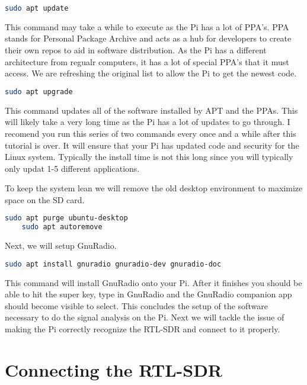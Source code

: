 \documentclass[letterpaper,12pt,notitlepage]{report} %
\begin{document}
\begin{lstlisting}[language=bash]
	sudo apt update
\end{lstlisting}

This command may take a while to execute as the Pi has a lot of PPA's. PPA stands for Personal Package Archive and acts as a hub for developers to create their own repos to aid in software distribution. As the Pi has a different architecture from regualr computers, it has a lot of special PPA's that it must access. We are refreshing the original list to allow the Pi to get the newest code.

\begin{lstlisting}[language=bash]
	sudo apt upgrade
\end{lstlisting}

This command updates all of the software installed by APT and the PPAs. This will likely take a very long time as the Pi has a lot of updates to go through. I recomend you run this series of two commands every once and a while after this tutorial is over. It will ensure that your Pi has updated code and security for the Linux system. Typically the install time is not this long since you will typically only updat 1-5 different applications. 

To keep the system lean we will remove the old desktop environment to maximize space on the SD card. 

\begin{lstlisting}[language=bash]
	sudo apt purge ubuntu-desktop
	sudo apt autoremove
\end{lstlisting}

Next, we will setup GnuRadio. 

\begin{lstlisting}[language=bash]
	sudo apt install gnuradio gnuradio-dev gnuradio-doc
\end{lstlisting}

This command will install GnuRadio onto your Pi. After it finishes you should be able to hit the super key, type in GnuRadio and the GnuRadio companion app should become visible to select. 
This concludes the setup of the software necessary to do the signal analysis on the Pi. Next we will tackle the issue of making the Pi correctly recognize the RTL-SDR and connect to it properly.

\section{Connecting the RTL-SDR}
\end{document}
